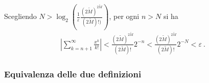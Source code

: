 \documentclass[letterpaper,10pt,italian]{jupyterBook}
\begin{document}
\sphinxAtStartPar
Scegliendo \(N > \log_2 \left( \frac{1}{\varepsilon} \frac{(2\tilde{M})^{2 \tilde{M}}}{(2 \tilde{M})!)} \right)\), per ogni \(n > N\) si ha
\begin{equation*}
\begin{split}\left| \sum_{k=n+1}^{\infty} \frac{x^k}{k!} \right| <  \frac{(2 \tilde{M})^{2 \tilde{M}}}{(2\tilde{M})!} 2^{-n} <  \frac{(2 \tilde{M})^{2 \tilde{M}}}{(2\tilde{M})!} 2^{-N} < \varepsilon \ .\end{split}
\end{equation*}

\subsubsection{Equivalenza delle due definizioni}
\label{\detokenize{ch/precalculus/exponential_logarithm-notes:equivalenza-delle-due-definizioni}}\label{\detokenize{ch/precalculus/exponential_logarithm-notes:math-hs-exp-log-notes-equivalence}}
\end{document}
